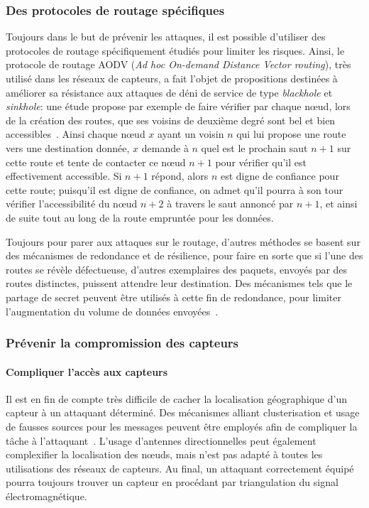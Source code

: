     \subsubsection{Des protocoles de routage spécifiques}
Toujours dans le but de prévenir les attaques, il est possible d'utiliser des protocoles de routage spécifiquement étudiés pour limiter les risques.
Ainsi, le protocole de routage AODV (\textit{Ad hoc On-demand Distance Vector routing}), très utilisé dans les réseaux de capteurs, a fait l'objet de propositions destinées à améliorer sa résistance aux attaques de déni de service de type \textit{blackhole} et \textit{sinkhole}: une étude propose par exemple de faire vérifier par chaque nœud, lors de la création des routes, que ses voisins de deuxième degré sont bel et bien accessibles~\cite{DLA02}.
Ainsi chaque nœud $x$ ayant un voisin $n$ qui lui propose une route vers une destination donnée, $x$ demande à $n$ quel est le prochain saut $n+1$ sur cette route et tente de contacter ce nœud $n+1$ pour vérifier qu'il est effectivement accessible.
Si $n+1$ répond, alors $n$ est digne de confiance pour cette route; puisqu'il est digne de confiance, on admet qu'il pourra à son tour vérifier l'accessibilité du nœud $n+2$ à travers le saut annoncé par $n+1$, et ainsi de suite tout au long de la route empruntée pour les données.

Toujours pour parer aux attaques sur le routage, d'autres méthodes se basent sur des mécanismes de redondance et de résilience, pour faire en sorte que si l'une des routes se révèle défectueuse, d'autres exemplaires des paquets, envoyés par des routes distinctes, puissent attendre leur destination.
Des mécanismes tels que le partage de secret peuvent être utilisés à cette fin de redondance, pour limiter l'augmentation du volume de données envoyées~\cite{MMB13}.

    \subsubsection{Prévenir la compromission des capteurs}
        \paragraph{Compliquer l'accès aux capteurs}
Il est en fin de compte très difficile de cacher la localisation géographique d'un capteur à un attaquant déterminé.
Des mécanismes alliant clusterisation et usage de fausses sources pour les messages peuvent être employés afin de compliquer la tâche à l'attaquant~\cite{GK13}.
L'usage d'antennes directionnelles peut également complexifier la localisation des nœuds, mais n'est pas adapté à toutes les utilisations des réseaux de capteurs.
Au final, un attaquant correctement équipé pourra toujours trouver un capteur en procédant par triangulation du signal électromagnétique.

